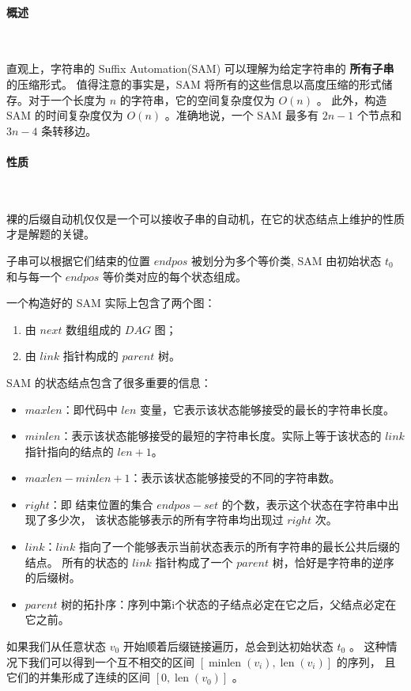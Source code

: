 \paragraph{概述}~{}
\par
直观上，字符串的 Suffix Automation(SAM) 可以理解为给定字符串的 \textbf{所有子串} 的压缩形式。
值得注意的事实是，SAM 将所有的这些信息以高度压缩的形式储存。对于一个长度为 $n$ 的字符串，它的空间复杂度仅为 $O(n)$ 。
此外，构造 SAM 的时间复杂度仅为 $O(n)$ 。准确地说，一个 SAM 最多有 $2n-1$ 个节点和 $3n-4$ 条转移边。 \par

\paragraph{性质}~{}
\par
裸的后缀自动机仅仅是一个可以接收子串的自动机，在它的状态结点上维护的性质才是解题的关键。\par

子串可以根据它们结束的位置 $endpos$ 被划分为多个等价类, SAM 由初始状态 $t_0$ 和与每一个 $endpos$ 等价类对应的每个状态组成。\par

一个构造好的 SAM 实际上包含了两个图：\par
\begin{enumerate}
\item 由 $next$ 数组组成的 $DAG$ 图；\par
\item 由 $link$ 指针构成的 $parent$ 树。\par
\end{enumerate}
SAM 的状态结点包含了很多重要的信息：\par
\begin{itemize}
\item $maxlen$：即代码中 $len$ 变量，它表示该状态能够接受的最长的字符串长度。\par
\item $minlen$：表示该状态能够接受的最短的字符串长度。实际上等于该状态的 $link$ 指针指向的结点的 $len+1$。\par
\item $maxlen-minlen+1$：表示该状态能够接受的不同的字符串数。\par
\item $right$：即 结束位置的集合 $endpos-set$ 的个数，表示这个状态在字符串中出现了多少次，
该状态能够表示的所有字符串均出现过 $right$ 次。\par
\item $link$：$link$ 指向了一个能够表示当前状态表示的所有字符串的最长公共后缀的结点。
所有的状态的 $link$ 指针构成了一个 $parent$ 树，恰好是字符串的逆序的后缀树。\par
\item $parent$ 树的拓扑序：序列中第i个状态的子结点必定在它之后，父结点必定在它之前。\par
\end{itemize}
如果我们从任意状态 $v_0$ 开始顺着后缀链接遍历，总会到达初始状态 $t_0$ 。
这种情况下我们可以得到一个互不相交的区间 $[\operatorname{minlen}(v_i),\operatorname{len}(v_i)]$ 的序列，
且它们的并集形成了连续的区间 $[0,\operatorname{len}(v_0)]$ 。\par


